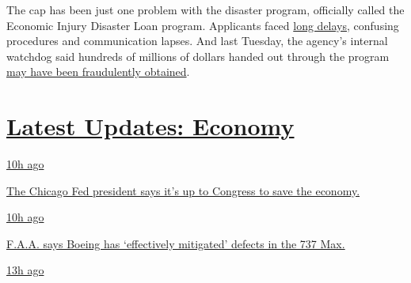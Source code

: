 The cap has been just one problem with the disaster program, officially
called the Economic Injury Disaster Loan program. Applicants faced
\href{https://www.nytimes.com/2020/04/09/business/smallbusiness/small-business-disaster-loans-coronavirus.html}{long
delays}, confusing procedures and communication lapses. And last
Tuesday, the agency's internal watchdog said hundreds of millions of
dollars handed out through the program
\href{https://www.nytimes.com/live/2020/07/28/business/stock-market-today-coronavirus\#thieves-are-targeting-small-business-relief-programs-a-watchdog-says}{may
have been fraudulently obtained}.

\hypertarget{latest-updates-economy}{%
\section{\texorpdfstring{\href{https://www.nytimes.com/live/2020/08/03/business/stock-market-today-coronavirus?action=click\&pgtype=Article\&state=default\&region=MAIN_CONTENT_1\&context=storylines_live_updates}{Latest
Updates:
Economy}}{Latest Updates: Economy}}\label{latest-updates-economy}}

\href{https://www.nytimes.com/live/2020/08/03/business/stock-market-today-coronavirus?action=click\&pgtype=Article\&state=default\&region=MAIN_CONTENT_1\&context=storylines_live_updates\#the-chicago-fed-president-says-its-up-to-congress-to-save-the-economy}{10h
ago}

\href{https://www.nytimes.com/live/2020/08/03/business/stock-market-today-coronavirus?action=click\&pgtype=Article\&state=default\&region=MAIN_CONTENT_1\&context=storylines_live_updates\#the-chicago-fed-president-says-its-up-to-congress-to-save-the-economy}{The
Chicago Fed president says it's up to Congress to save the economy.}

\href{https://www.nytimes.com/live/2020/08/03/business/stock-market-today-coronavirus?action=click\&pgtype=Article\&state=default\&region=MAIN_CONTENT_1\&context=storylines_live_updates\#faa-says-boeing-has-effectively-mitigated-defects-in-the-737-max}{10h
ago}

\href{https://www.nytimes.com/live/2020/08/03/business/stock-market-today-coronavirus?action=click\&pgtype=Article\&state=default\&region=MAIN_CONTENT_1\&context=storylines_live_updates\#faa-says-boeing-has-effectively-mitigated-defects-in-the-737-max}{F.A.A.
says Boeing has `effectively mitigated' defects in the 737 Max.}

\href{https://www.nytimes.com/live/2020/08/03/business/stock-market-today-coronavirus?action=click\&pgtype=Article\&state=default\&region=MAIN_CONTENT_1\&context=storylines_live_updates\#small-businesses-got-emergency-loans-but-not-what-they-expected}{13h
ago}

